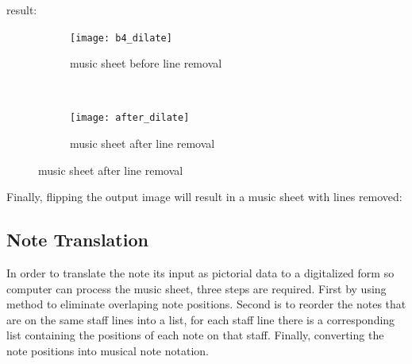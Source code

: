 \documentclass[a4paper,12pt]{report}
\begin{document}
result:
\begin{figure}[H]
    \centering
    \begin{subfigure}[t]{0.5\textwidth}
        \centering
        \texttt{[image: b4\_dilate]}
        \caption{music sheet before line removal}
    \end{subfigure}%
    ~ 
    \begin{subfigure}[t]{0.5\textwidth}
        \centering
        \texttt{[image: after\_dilate]}
        \caption{music sheet after line removal}
    \end{subfigure}
\end{figure}

\clearpage
Finally, flipping the output image will result in a music sheet with lines
removed:
\begin{center}
\end{center}

\clearpage

\subsection{Note Translation}
In order to translate the note its input as pictorial data to a digitalized form so 
computer can process the music sheet, three steps are required. First by using 
\textcite{Rosebrock} method to eliminate overlaping note positions. Second is to
reorder the notes that are on the same staff lines into a list, for each staff line
there is a corresponding list containing the positions of each note on that staff.
Finally, converting the note positions into musical note notation.
\end{document}
